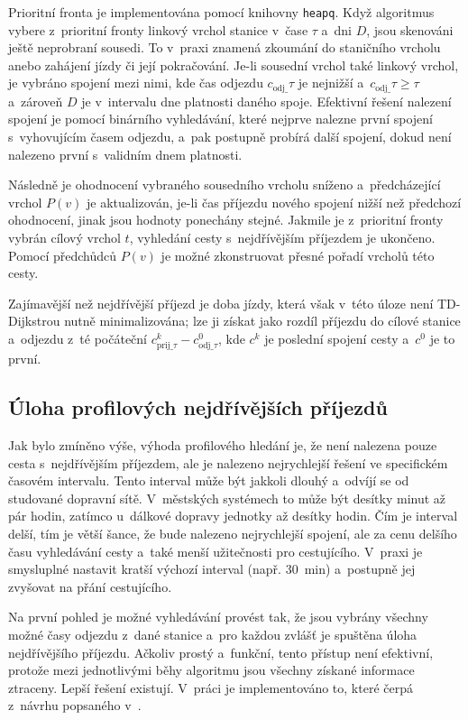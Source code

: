 Prioritní fronta je implementována pomocí knihovny \texttt{heapq}. Když algoritmus vybere z~prioritní fronty linkový vrchol stanice v~čase $\tau$ a~dni \(D\), jsou skenováni ještě neprobraní sousedi. To v~praxi znamená zkoumání  do staničního vrcholu anebo zahájení jízdy či její pokračování. Je-li sousední vrchol také linkový vrchol, je vybráno spojení mezi nimi, kde čas odjezdu $c_\text{odj\_}\tau$ je nejnižší a~$c_\text{odj\_}\tau \geq \tau$ a~zároveň $D$ je v~intervalu dne platnosti daného spoje. Efektivní řešení nalezení spojení je pomocí binárního vyhledávání, které nejprve nalezne první spojení s~vyhovujícím časem odjezdu, a~pak postupně probírá další spojení, dokud není nalezeno první s~validním dnem platnosti.

Následně je ohodnocení vybraného sousedního vrcholu sníženo a~předcházející vrchol $P(v)$ je aktualizován, je-li čas příjezdu nového spojení nižší než předchozí ohodnocení, jinak jsou hodnoty ponechány stejné. Jakmile je z~prioritní fronty vybrán cílový vrchol $t$, vyhledání cesty s~nejdřívějším příjezdem je ukončeno. Pomocí předchůdců $P(v)$ je možné zkonstruovat přesné pořadí vrcholů této cesty.

Zajímavější než nejdřívější příjezd je doba jízdy, která však v~této úloze není TD-Dijkstrou nutně minimalizována; lze ji získat jako rozdíl příjezdu do cílové stanice a~odjezdu z~té počáteční $c^k_{\text{prij\_}\tau} - c^0_{\text{odj\_}\tau}$, kde $c^k$ je poslední spojení cesty a~$c^0$ je to první. 

\subsection{Úloha profilových nejdřívějších příjezdů}
Jak bylo zmíněno výše, výhoda profilového hledání je, že není nalezena pouze cesta s~nejdřívějším příjezdem, ale je nalezeno nejrychlejší řešení ve specifickém časovém intervalu. Tento interval může být jakkoli dlouhý a~odvíjí se od studované dopravní sítě. V~městských systémech to může být desítky minut až pár hodin, zatímco u~dálkové dopravy jednotky až desítky hodin. Čím je interval delší, tím je větší šance, že bude nalezeno nejrychlejší spojení, ale za cenu delšího času vyhledávání cesty a~také menší užitečnosti pro cestujícího. V~praxi je smysluplné nastavit kratší výchozí interval (např. 30~min) a~postupně jej zvyšovat na přání cestujícího.

Na první pohled je možné vyhledávání provést tak, že jsou vybrány všechny možné časy odjezdu z~dané stanice a~pro každou zvlášť je spuštěna úloha nejdřívějšího příjezdu. Ačkoliv prostý a~funkční, tento přístup není efektivní, protože mezi jednotlivými běhy algoritmu jsou všechny získané informace ztraceny. Lepší řešení existují. V~práci je implementováno to, které čerpá z~návrhu popsaného v~\cite{wirthCHDiploma}.

